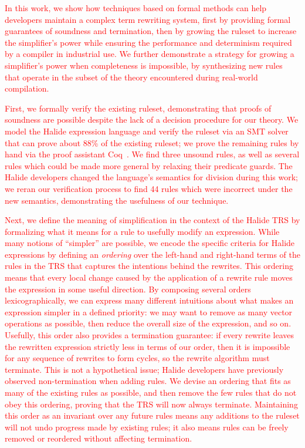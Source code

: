 \documentclass[acmsmall,review]{acmart}\settopmatter{printfolios=true,printccs=false,printacmref=false}
\newcommand{\modified}[1]{\textcolor{red}{{#1}}}
\begin{document}
\modified{ In this work, we show how techniques based on formal methods can help developers
 maintain a complex term rewriting system, first by providing formal guarantees 
 of soundness and termination, then by growing the ruleset to increase the simplifier's 
 power while ensuring the performance and determinism required by a compiler in 
 industrial use.  We further demonstrate a strategy for growing a simplifier's power
 when completeness is impossible, by synthesizing new rules that operate in
 the subset of the theory encountered during real-world compilation.}

\modified{First, we formally verify the existing 
ruleset, demonstrating that proofs of soundness are possible despite the lack of a 
decision procedure for our theory. We model the Halide expression language and verify 
the ruleset via an SMT solver that can prove about 88\% of the existing ruleset;
we prove the remaining rules by hand via the proof assistant Coq~\cite{Coq19}. We find three unsound rules, 
as well as several rules which could be made more general by relaxing their predicate guards. 
The Halide developers changed the language's semantics for division during this work; we reran our verification 
process to find 44 rules which were incorrect under the new semantics, demonstrating 
the usefulness of our technique.}

\modified{Next, we define the meaning of simplification in the context of the Halide TRS
by formalizing what it means for a rule to usefully modify an expression.  While
many notions of ``simpler'' are possible, we encode the specific criteria for Halide
expressions by defining an \emph{ordering} over the left-hand and right-hand terms of 
the rules in the TRS that captures the intentions behind the rewrites. This ordering 
means that every local change caused by the application of a rewrite rule moves the 
expression in some useful direction. By composing several orders lexicographically, 
we can express many different intuitions about what makes an expression simpler in a
defined priority: we may want to remove as many vector operations as possible, 
then reduce the overall size of the expression, and so on. Usefully, this order also provides a termination guarantee: 
if every rewrite leaves the rewritten expression strictly less in terms of our order, 
then it is impossible for any sequence of rewrites to form cycles, so the rewrite 
algorithm must terminate. This is not a hypothetical issue; Halide developers have previously
observed non-termination when adding rules.  We devise an ordering that fits as many of the existing rules as 
possible, and then remove the few rules that do not obey this ordering, proving
that the TRS will now always terminate. Maintaining this order as 
an invariant over any future rules means any additions to the ruleset will not undo 
progress made by existing rules; it also means rules can be freely removed or reordered 
without affecting termination.}
\end{document}
